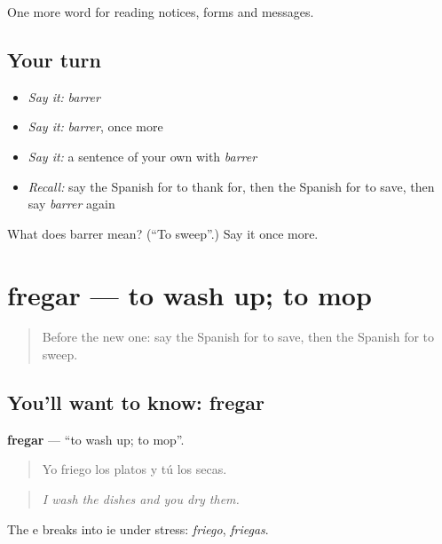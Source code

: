 \begin{grammarlens}[title={What you've built}]
One more word for reading notices, forms and messages.
\end{grammarlens}

\subsection*{Your turn}
\begin{itemize}
\raggedright
  \item \emph{Say it:} \emph{barrer}
  \item \emph{Say it:} \emph{barrer}, once more
  \item \emph{Say it:} a sentence of your own with \emph{barrer}
  \item \emph{Recall:} say the Spanish for to thank for, then the Spanish for to save, then say \emph{barrer} again
\end{itemize}

\begin{tcolorbox}[breakable,colback=teal!4,colframe=teal!35!black,title={Before you move on}]
What does barrer mean? (\textquotedblleft{}To sweep\textquotedblright{}.) Say it once more.
\end{tcolorbox}
\section[fregar]{fregar — to wash up; to mop}

\label{lesson:ES-C485-fregar}



\begin{quote}
Before the new one: say the Spanish for to save, then the Spanish for to sweep.
\end{quote}

\subsection*{You'll want to know: fregar}
\textbf{fregar} — \textquotedblleft{}to wash up; to mop\textquotedblright{}.

\begin{quote}
Yo friego los platos y tú los secas.
\end{quote}

\begin{quote}
\emph{I wash the dishes and you dry them.}
\end{quote}

The e breaks into ie under stress: \emph{friego}, \emph{friegas}.

